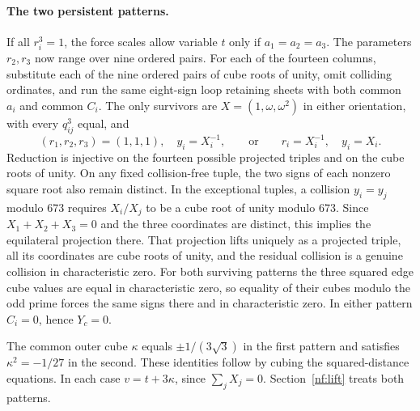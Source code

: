 \documentclass[11pt,letterpaper]{article}
\theoremstyle{definition}
\begin{document}
\paragraph{The two persistent patterns.}

If all $r_i^3=1$, the force scales allow variable $t$ only if $a_1=a_2=a_3$. The parameters $r_2,r_3$ now range over nine ordered pairs. For each of the fourteen columns, substitute each of the nine ordered pairs of cube roots of unity, omit colliding ordinates, and run the same eight-sign loop retaining sheets with both common $a_i$ and common $C_i$. The only survivors are $X=(1,\omega,\omega^2)$ in either orientation, with every $q_{ij}^3$ equal, and
\[
(r_1,r_2,r_3)=(1,1,1),\quad y_i=X_i^{-1},
\qquad\text{or}\qquad
r_i=X_i^{-1},\quad y_i=X_i .
\]
Reduction is injective on the fourteen possible projected triples and on the cube roots of unity. On any fixed collision-free tuple, the two signs of each nonzero square root also remain distinct. In the exceptional tuples, a collision $y_i=y_j$ modulo 673 requires $X_i/X_j$ to be a cube root of unity modulo 673. Since $X_1+X_2+X_3=0$ and the three coordinates are distinct, this implies the equilateral projection there. That projection lifts uniquely as a projected triple, all its coordinates are cube roots of unity, and the residual collision is a genuine collision in characteristic zero. For both surviving patterns the three squared edge cube values are equal in characteristic zero, so equality of their cubes modulo the odd prime forces the same signs there and in characteristic zero. In either pattern $C_i=0$, hence $Y_c=0$.

The common outer cube $\kappa$ equals $\pm1/(3\sqrt3)$ in the first
pattern and satisfies $\kappa^2=-1/27$ in the second. These identities follow
by cubing the squared-distance equations. In each case $v=t+3\kappa$,
since $\sum_jX_j=0$. Section~\ref{nf:lift} treats both patterns.
\end{document}
